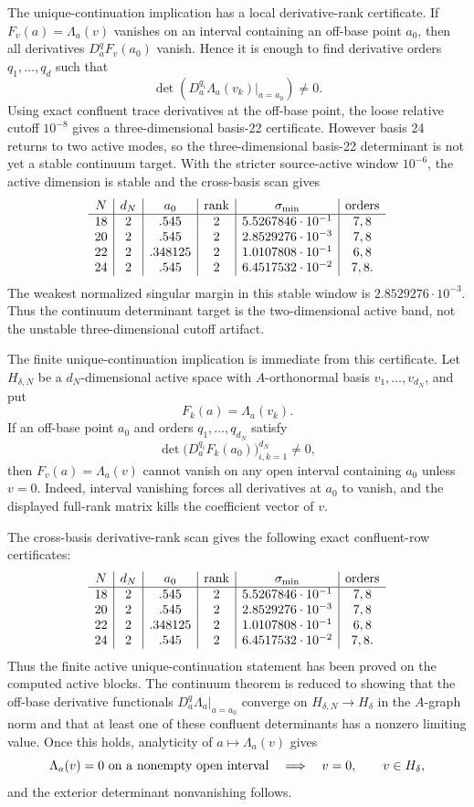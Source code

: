 \documentclass[11pt]{article}
\begin{document}
The unique-continuation implication has a local derivative-rank certificate.
If \(F_v(a)=\Lambda_a(v)\) vanishes on an interval containing an off-base point
\(a_0\), then all derivatives \(D_a^qF_v(a_0)\) vanish.  Hence it is enough to
find derivative orders \(q_1,\ldots,q_d\) such that
\[
  \det\left(D_a^{q_i}\Lambda_a(v_k)|_{a=a_0}\right)\ne0.
\]
Using exact confluent trace derivatives at the off-base point, the loose
relative cutoff \(10^{-8}\) gives a three-dimensional basis-22 certificate.
However basis 24 returns to two active modes, so the three-dimensional
basis-22 determinant is not yet a stable continuum target.  With the stricter
source-active window \(10^{-6}\), the active dimension is stable and the
cross-basis scan gives
\[
\begin{array}{c|c|c|c|c|c}
N&d_N&a_0&{\rm rank}&\sigma_{\min}&{\rm orders}\\\hline
18&2&.545&2&5.5267846\cdot10^{-1}&7,8\\
20&2&.545&2&2.8529276\cdot10^{-3}&7,8\\
22&2&.348125&2&1.0107808\cdot10^{-1}&6,8\\
24&2&.545&2&6.4517532\cdot10^{-2}&7,8.
\end{array}
\]
The weakest normalized singular margin in this stable window is
\(2.8529276\cdot10^{-3}\).  Thus the continuum determinant target is the
two-dimensional active band, not the unstable three-dimensional cutoff
artifact.

The finite unique-continuation implication is immediate from this certificate.
Let \(H_{\delta,N}\) be a \(d_N\)-dimensional active space with
\(A\)-orthonormal basis \(v_1,\ldots,v_{d_N}\), and put
\[
  F_k(a)=\Lambda_a(v_k).
\]
If an off-base point \(a_0\) and orders \(q_1,\ldots,q_{d_N}\) satisfy
\[
  \det\bigl(D_a^{q_i}F_k(a_0)\bigr)_{i,k=1}^{d_N}\ne0,
\]
then \(F_v(a)=\Lambda_a(v)\) cannot vanish on any open interval containing
\(a_0\) unless \(v=0\).  Indeed, interval vanishing forces all derivatives at
\(a_0\) to vanish, and the displayed full-rank matrix kills the coefficient
vector of \(v\).

The cross-basis derivative-rank scan gives the following exact confluent-row
certificates:
\[
\begin{array}{c|c|c|c|c|c}
N&d_N&a_0&{\rm rank}&\sigma_{\min}&{\rm orders}\\\hline
18&2&.545&2&5.5267846\cdot10^{-1}&7,8\\
20&2&.545&2&2.8529276\cdot10^{-3}&7,8\\
22&2&.348125&2&1.0107808\cdot10^{-1}&6,8\\
24&2&.545&2&6.4517532\cdot10^{-2}&7,8.
\end{array}
\]
Thus the finite active unique-continuation statement has been proved on the
computed active blocks.  The continuum theorem is reduced to showing that the
off-base derivative functionals \(D_a^q\Lambda_a|_{a=a_0}\) converge on
\(H_{\delta,N}\to H_\delta\) in the \(A\)-graph norm and that at least one of
these confluent determinants has a nonzero limiting value.  Once this holds,
analyticity of \(a\mapsto\Lambda_a(v)\) gives
\[
  \Lambda_a(v)=0\ {\rm on\ a\ nonempty\ open\ interval}
  \quad\Longrightarrow\quad v=0,\qquad v\in H_\delta,
\]
and the exterior determinant nonvanishing follows.
\end{document}
